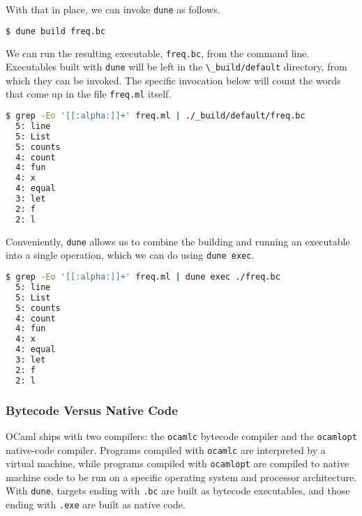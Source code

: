 With that in place, we can invoke \passthrough{\lstinline!dune!} as
follows.

\begin{lstlisting}[language=bash]
$ dune build freq.bc
\end{lstlisting}

We can run the resulting executable, \passthrough{\lstinline!freq.bc!},
from the command line. Executables built with
\passthrough{\lstinline!dune!} will be left in the
\passthrough{\lstinline!\_build/default!} directory, from which they can
be invoked. The specific invocation below will count the words that come
up in the file \passthrough{\lstinline!freq.ml!} itself.

\begin{lstlisting}[language=bash]
$ grep -Eo '[[:alpha:]]+' freq.ml | ./_build/default/freq.bc
  5: line
  5: List
  5: counts
  4: count
  4: fun
  4: x
  4: equal
  3: let
  2: f
  2: l
\end{lstlisting}

Conveniently, \passthrough{\lstinline!dune!} allows us to combine the
building and running an executable into a single operation, which we can
do using \passthrough{\lstinline!dune exec!}.

\begin{lstlisting}[language=bash]
$ grep -Eo '[[:alpha:]]+' freq.ml | dune exec ./freq.bc
  5: line
  5: List
  5: counts
  4: count
  4: fun
  4: x
  4: equal
  3: let
  2: f
  2: l
\end{lstlisting}

\hypertarget{bytecode-versus-native-code}{%
\subsubsection{Bytecode Versus Native
Code}\label{bytecode-versus-native-code}}

OCaml ships with two compilers: the \passthrough{\lstinline!ocamlc!}
bytecode compiler and the \passthrough{\lstinline!ocamlopt!} native-code
compiler. Programs compiled with \passthrough{\lstinline!ocamlc!} are
interpreted by a virtual machine, while programs compiled with
\passthrough{\lstinline!ocamlopt!} are compiled to native machine code
to be run on a specific operating system and processor architecture.
With \passthrough{\lstinline!dune!}, targets ending with
\passthrough{\lstinline!.bc!} are built as bytecode executables, and
those ending with \passthrough{\lstinline!.exe!} are built as native
code.

